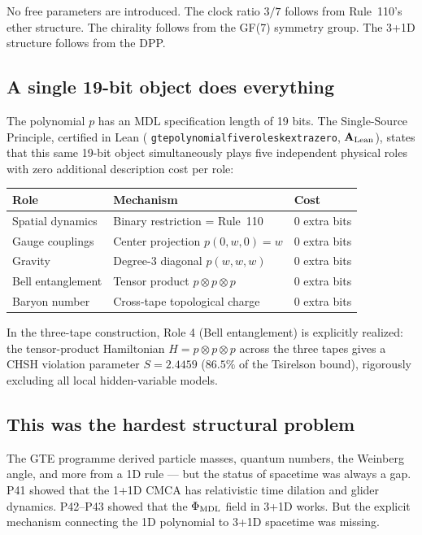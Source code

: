 \documentclass[11pt,a4paper]{article}
\newcommand{\lean}[1]{%
  \penalty-100
  \begingroup\def\_{\textunderscore\allowbreak}\texttt{#1}\endgroup}
\newcommand{\CatAL}{\ensuremath{\mathbf{A}_{\rm Lean}}}
\begin{document}
No free parameters are introduced.  The clock ratio $3/7$ follows from
Rule~110's ether structure.  The chirality follows from the GF(7) symmetry
group.  The 3+1D structure follows from the DPP.

\subsection{A single 19-bit object does everything}

The polynomial $p$ has an MDL specification length of 19 bits.  The
Single-Source Principle, certified in Lean
(\lean{gte\_polynomial\_five\_roles\_k\_extra\_zero}, \CatAL), states that
this same 19-bit object simultaneously plays five independent physical roles
with zero additional description cost per role:

\begin{center}
\begin{tabular}{lll}
\toprule
Role & Mechanism & Cost \\
\midrule
Spatial dynamics & Binary restriction = Rule~110 & 0 extra bits \\
Gauge couplings  & Center projection $p(0,w,0) = w$ & 0 extra bits \\
Gravity          & Degree-3 diagonal $p(w,w,w)$ & 0 extra bits \\
Bell entanglement & Tensor product $p \otimes p \otimes p$ & 0 extra bits \\
Baryon number    & Cross-tape topological charge & 0 extra bits \\
\bottomrule
\end{tabular}
\end{center}

In the three-tape construction, Role 4 (Bell entanglement) is explicitly
realized: the tensor-product Hamiltonian $H = p \otimes p \otimes p$
across the three tapes gives a CHSH violation parameter
$S = 2.4459$ ($86.5\%$ of the Tsirelson bound), rigorously excluding
all local hidden-variable models.

\subsection{This was the hardest structural problem}

The GTE programme derived particle masses, quantum numbers, the Weinberg
angle, and more from a 1D rule --- but the status of spacetime was
always a gap.  P41 showed that the 1+1D CMCA has relativistic time
dilation and glider dynamics.  P42--P43 showed that the
$\Phi_{\rm MDL}$ field in 3+1D works.  But the explicit mechanism
connecting the 1D polynomial to 3+1D spacetime was missing.
\end{document}
